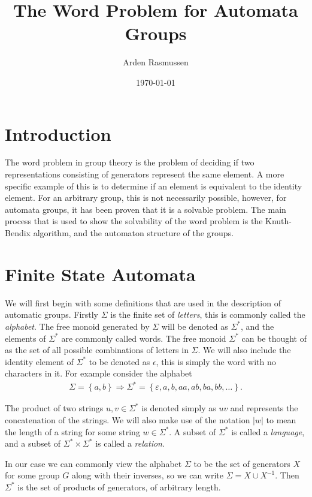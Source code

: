\documentclass[10pt]{amsart}
\title{The Word Problem for Automata Groups}
\author{Arden Rasmussen}
\date{\today}
\theoremstyle{definition}
\begin{document}
\maketitle

\section{Introduction}%
\label{sec:Introduction}

The word problem in group theory is the problem of deciding if two
representations consisting of generators represent the same element. A more
specific example of this is to determine if an element is equivalent to the
identity element. For an arbitrary group, this is not necessarily possible,
however, for automata groups, it has been proven that it is a solvable problem.
The main process that is used to show the solvability of the word problem is
the Knuth-Bendix algorithm, and the automaton structure of the groups.

\section{Finite State Automata}%
\label{sec:finite_state_automata}

We will first begin with some definitions that are used in the description of
automatic groups. Firstly $\Sigma$ is the finite set of \textit{letters}, this
is commonly called the \textit{alphabet}. The free monoid generated by $\Sigma$
will be denoted as $\Sigma^*$, and the elements of $\Sigma^*$ are commonly
called words. The free monoid $\Sigma^*$ can be thought of as the set of all
possible combinations of letters in $\Sigma$. We will also include the identity
element of $\Sigma^*$ to be denoted as $\epsilon$, this is simply the word with
no characters in it. For example consider the alphabet
\begin{align*}
  \Sigma=\left\{a,b\right\}\Rightarrow\Sigma^*=\left\{\varepsilon, a,b,aa,ab,ba,bb,\ldots\right\}.
\end{align*}

The product of two strings $u,v\in\Sigma^*$ is denoted simply as $uv$ and
represents the concatenation of the strings. We will also make use of the
notation $|w|$ to mean the length of a string for some string $w\in\Sigma^*$. A
subset of $\Sigma^*$ is called a \textit{language}, and a subset of
$\Sigma^*\times\Sigma^*$ is called a \textit{relation}.

In our case we can commonly view the alphabet $\Sigma$ to be the set of
generators $X$ for some group $G$ along with their inverses, so we can write
$\Sigma=X\cup X^{-1}$. Then $\Sigma^*$ is the set of products of
generators, of arbitrary length.
\end{document}
